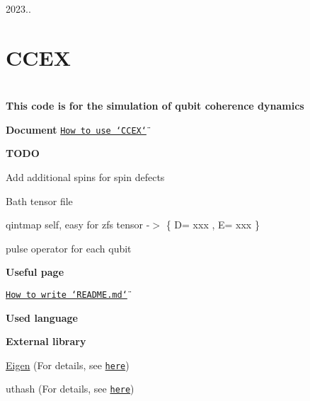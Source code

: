 2023..

\section*{C\-C\-E\-X}

  

\par


\section*{}

\par
 {\bfseries This code is for the simulation of qubit coherence dynamics\par
}

{\bfseries Document} \href{https://cce-x-refactoring.vercel.app/index.html}{\tt How to use \char`\"{}\-C\-C\-E\-X\char`\"{}}

{\bfseries T\-O\-D\-O}
\begin{DoxyItemize}
\item Add additional spins for spin defects
\item Bath tensor file
\item qintmap self, easy for zfs tensor -\/$>$ \{ D= xxx , E= xxx \}
\item pulse operator for each qubit \par

\end{DoxyItemize}

{\bfseries Useful page}
\begin{DoxyItemize}
\item \href{https://docs.github.com/ko/get-started/writing-on-github/getting-started-with-writing-and-formatting-on-github/basic-writing-and-formatting-syntax}{\tt How to write \char`\"{}\-R\-E\-A\-D\-M\-E.\-md\char`\"{}}
\end{DoxyItemize}

{\bfseries Used language}\par
     \par


{\bfseries External library}\par
 \hyperlink{namespaceEigen}{Eigen} (For details, see \href{https://eigen.tuxfamily.org/index.php?title=Main_Page}{\tt here})\par
 uthash (For details, see \href{https://troydhanson.github.io/uthash/userguide.html#_a_hash_in_c}{\tt here})\par
 \par


